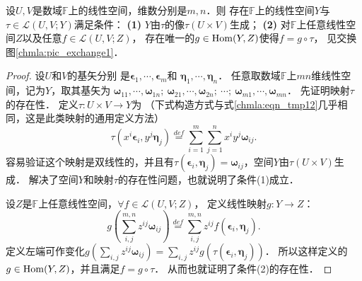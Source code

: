 \begin{theorem}\label{chmla:thm_jicunzai}
    设$U,V$是数域$\mathbb{F}$上的线性空间，维数分别是$m,n$．则
    存在$\mathbb{F}$上的线性空间$Y$与$\tau \in \mathscr{L}(U,V;Y)$满足条件：
    {\bfseries (1)} $Y$由$\tau$的像$\tau(U\times V)$生成；
    {\bfseries (2)} 对$\mathbb{F}$上任意线性空间$Z$以及任意$f \in \mathscr{L}(U,V;Z)$，
    存在唯一的$g\in {\rm Hom}(Y,Z)$使得$f=g \circ \tau$，
    见交换图\ref{chmla:pic_exchange1}．
\end{theorem}
\begin{proof}
    设$U$和$V$的基矢分别
    是$\boldsymbol{\epsilon}_1, \cdots, \boldsymbol{\epsilon}_m$和
    $\boldsymbol{\eta}_1, \cdots, \boldsymbol{\eta}_n$．
    任意取数域$\mathbb{F}$上$mn$维线性空间，记为$Y$，取其基矢为
    $\boldsymbol{\omega}_{11},  \cdots ,\boldsymbol{\omega}_{1n}; \
     \boldsymbol{\omega}_{21},  \cdots ,\boldsymbol{\omega}_{2n}; \  \cdots ;\ 
     \boldsymbol{\omega}_{m1}, \cdots ,\boldsymbol{\omega}_{mn}$．
    先证明映射$\tau$的存在性．    定义$\tau: U\times V \to Y$为
    （下式构造方式与式\eqref{chmla:eqn_tmp12}几乎相同，这是此类映射的通用定义方法）
    \begin{equation}\label{chmla:eqn_tensorpruduct}
            \tau \left(x^i\boldsymbol{\epsilon}_i, y^j\boldsymbol{\eta}_j\right)
            \overset{def}{=} \sum_{i=1}^{m} \sum_{j=1}^{n} x^i y^j \boldsymbol{\omega}_{ij} .
        \end{equation}
    容易验证这个映射是双线性的，并且有$\tau (\boldsymbol{\epsilon}_i, \boldsymbol{\eta}_j)
     = \boldsymbol{\omega}_{ij}$，空间$Y$由$\tau(U\times V)$生成．
    解决了空间$Y$和映射$\tau$的存在性问题，也就说明了条件(1)成立．



    设$Z$是$\mathbb{F}$上任意线性空间，$\forall f \in \mathscr{L}(U,V;Z)$，
    定义线性映射$g:Y \to Z$：
    \begin{equation}\label{chmla:eqn_fgtau}
            g \left(\sum_{i,j}^{m,n} z^{ij}\boldsymbol{\omega}_{ij}\right)
            \overset{def}{=} \sum_{i,j}^{m,n} z^{ij} f(\boldsymbol{\epsilon}_i, \boldsymbol{\eta}_j) .
    \end{equation}
    定义左端可作变化$g(\sum_{i,j} z^{ij}\boldsymbol{\omega}_{ij})
    = \sum_{i,j} z^{ij} g(\tau (\boldsymbol{\epsilon}_i, \boldsymbol{\eta}_j)  ) $．
    所以这样定义的$g\in {\rm Hom}(Y,Z)$，并且满足$f=g\circ \tau$．
    从而也就证明了条件(2)的存在性．


\end{proof}

